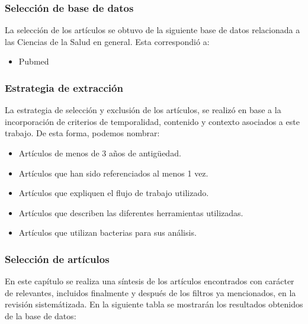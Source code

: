 \documentclass[12pt]{article}
\begin{document}
\subsubsection*{Selección de base de datos}

La selección de los artículos se obtuvo de la siguiente 
base de datos relacionada a las Ciencias de la Salud en general.
Esta correspondió a:

\begin{itemize}
    \item Pubmed
\end{itemize}

\subsubsection*{Estrategia de extracción}

La estrategia de selección y exclusión de los artículos, se 
realizó en base a la incorporación de  criterios de temporalidad, 
contenido y contexto asociados a este trabajo. De esta forma, 
podemos nombrar:

\begin{itemize}
    \item Artículos de menos de 3 años de antigüedad.
    \item Artículos que han sido referenciados al menos 1 vez.
    \item Artículos que expliquen el flujo de trabajo utilizado.
    \item Artículos que describen las diferentes herramientas utilizadas.
    \item Artículos que utilizan bacterias para sus análisis.
\end{itemize}

\subsubsection*{Selección de artículos}
En este capítulo se realiza una síntesis de los artículos 
encontrados con carácter de relevantes,  incluidos finalmente 
y después de los filtros ya mencionados, en la revisión 
sistemátizada. En la siguiente tabla se mostrarán los resultados 
obtenidos de la base de datos:
\end{document}
